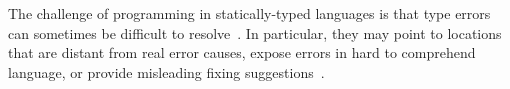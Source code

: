 The challenge of programming in statically-typed languages is that type errors can sometimes be difficult to resolve~\cite{tirronen_understanding_2015}. In particular, they may point to locations that are distant from real error causes, expose errors in hard to comprehend language, or provide misleading fixing suggestions~\cite{wu_how_2017}.


